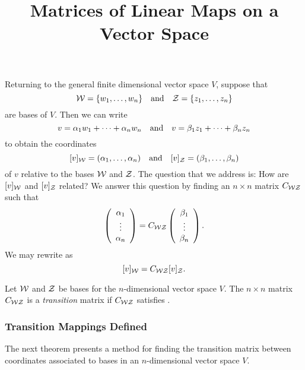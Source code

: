 \documentclass{ximera}
\title{Matrices of Linear Maps on a Vector Space}
\begin{document}
\begin{abstract}
\end{abstract}
\maketitle

  \label{MALT}
  


Returning to the general finite dimensional vector space $V$, suppose that
\[
{\cal W} = \{w_1,\ldots,w_n\} \quad\mbox{and}\quad {\cal Z} = \{z_1,\ldots,z_n\}
\]
are bases of $V$.  Then we can write
\[
v = \alpha_1 w_1 + \cdots + \alpha_n w_n \quad\mbox{and}\quad
v = \beta_1 z_1 + \cdots + \beta_n z_n
\]
to obtain the coordinates
\begin{equation}  \label{e:vincoords}
[v]_{\cal W} = (\alpha_1,\ldots,\alpha_n) \quad\mbox{and}\quad
[v]_{\cal Z} = (\beta_1,\ldots,\beta_n)
\end{equation}
of $v$ relative to the bases ${\cal W}$ and ${\cal Z}$.  The question that
we address is: How are $[v]_{\cal W}$ and $[v]_{\cal Z}$ related?  We answer
this question by finding an $n\times n$ matrix $C_{{\cal W}{\cal Z}}$ such that
\begin{equation} \label{e:coordchange}
\left(\begin{array}{c} \alpha_1 \\ \vdots \\ \alpha_{n}\end{array}\right) = C_{{\cal W}{\cal Z}} \left(\begin{array}{c} \beta_1 \\ \vdots \\ \beta_{n}\end{array}\right).
\end{equation}
We may rewrite  as
\begin{equation}  \label{e:coordchange2}
[v]_{\cal W} = C_{{\cal W}{\cal Z}}[v]_{\cal Z}.
\end{equation}

\begin{definition}
Let ${\cal W}$ and ${\cal Z}$ be bases for the $n$-dimensional
vector space $V$.  The $n\times n$ matrix $C_{{\cal W}{\cal Z}}$
is a {\em transition\/} matrix if $C_{{\cal W}{\cal Z}}$ satisfies
.
\end{definition}  


\subsubsection*{Transition Mappings Defined}

The next theorem presents a method for finding the transition matrix
between coordinates associated to bases in an $n$-dimensional vector
space $V$.
\end{document}
